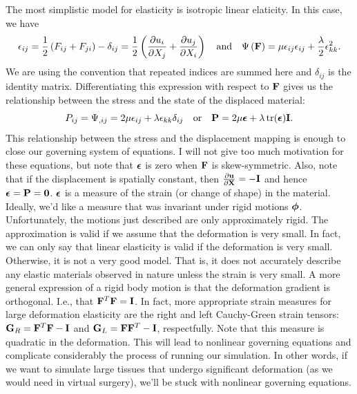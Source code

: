 The most simplistic model for elasticity is isotropic linear elaticity. In this case, we have
\begin{equation*}
\epsilon_{ij} = \frac{1}{2} \left( F_{ij} + F_{ji} \right) - \delta_{ij} = \frac{1}{2} \left( \frac{\partial u_i}{\partial X_j} + \frac{\partial u_j}{\partial X_i} \right) \quad \text{and} \quad \Psi \left( \mathbf{F} \right) = \mu \epsilon_{ij} \epsilon_{ij} + \frac{\lambda}{2} \epsilon_{kk}^2.
\end{equation*}
We are using the convention that repeated indices are summed here and $\delta_{ij}$ is the identity matrix. Differentiating this expression with respect to $\mathbf{F}$ gives us the relationship between the stress and the state of the displaced material:
\begin{equation*}
P_{ij} = \Psi_{,ij} = 2 \mu \epsilon_{ij} + \lambda \epsilon_{kk} \delta_{ij} \quad \text{or} \quad \mathbf{P} = 2 \mu \boldsymbol{\epsilon} + \lambda \operatorname{tr}(\boldsymbol{\epsilon}) \mathbf{I}.
\end{equation*}
This relationship between the stress and the displacement mapping is enough to close our governing system of equations. I will not give too much motivation for these equations, but note that $\boldsymbol{\epsilon}$ is zero when $\mathbf{F}$ is skew-symmetric. Also, note that if the displacement is spatially constant, then $\frac{\partial\mathbf{u}}{\partial\mathbf{X}} = -\mathbf{I}$ and hence $\boldsymbol{\epsilon} = \mathbf{P} = \mathbf{0}$. $\boldsymbol{\epsilon}$ is a measure of the strain (or change of shape) in the material. Ideally, we'd like a measure that was invariant under rigid motions $\boldsymbol{\phi}$. Unfortunately, the motions just described are only approximately rigid. The approximation is valid if we assume that the deformation is very small. In fact, we can only say that linear elasticity is valid if the deformation is very small. Otherwise, it is not a very good model. That is, it does not accurately describe any elastic materials observed in nature unless the strain is very small. A more general expression of a rigid body motion is that the deformation gradient is orthogonal. I.e., that $\mathbf{F}^T \mathbf{F} = \mathbf{I}$. In fact, more appropriate strain measures for large deformation elasticity are the right and left Cauchy-Green strain tensors: $\mathbf{G}_R = \mathbf{F}^T \mathbf{F} - \mathbf{I}$ and  $\mathbf{G}_L = \mathbf{F} \mathbf{F}^T - \mathbf{I}$, respectfully. Note that this measure is quadratic in the deformation. This will lead to nonlinear governing equations and complicate considerably the process of running our simulation. In other words, if we want to simulate large tissues that undergo significant deformation (as we would need in virtual surgery), we'll be stuck with nonlinear governing equations.

